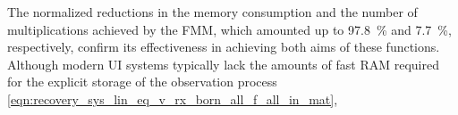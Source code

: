 The normalized reductions in
the memory consumption and
the number of
multiplications achieved by
the \ac{FMM}, which amounted up to
\SI{97.8}{\percent} and
\SI{7.7}{\percent},
respectively, confirm
its effectiveness in achieving
both aims of
these functions.
Although
modern \ac{UI} systems typically lack
the amounts of
fast \ac{RAM} required for
the explicit storage of
the observation process
\eqref{eqn:recovery_sys_lin_eq_v_rx_born_all_f_all_in_mat},
